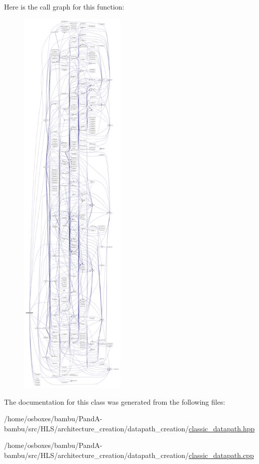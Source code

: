 Here is the call graph for this function\+:
\nopagebreak
\begin{figure}[H]
\begin{center}
\leavevmode
\includegraphics[height=550pt]{d3/d74/classclassic__datapath_a2630a430a4a5513d7d6ce4b8a37b3dff_cgraph}
\end{center}
\end{figure}


The documentation for this class was generated from the following files\+:\begin{DoxyCompactItemize}
\item 
/home/osboxes/bambu/\+Pand\+A-\/bambu/src/\+H\+L\+S/architecture\+\_\+creation/datapath\+\_\+creation/\hyperlink{classic__datapath_8hpp}{classic\+\_\+datapath.\+hpp}\item 
/home/osboxes/bambu/\+Pand\+A-\/bambu/src/\+H\+L\+S/architecture\+\_\+creation/datapath\+\_\+creation/\hyperlink{classic__datapath_8cpp}{classic\+\_\+datapath.\+cpp}\end{DoxyCompactItemize}
